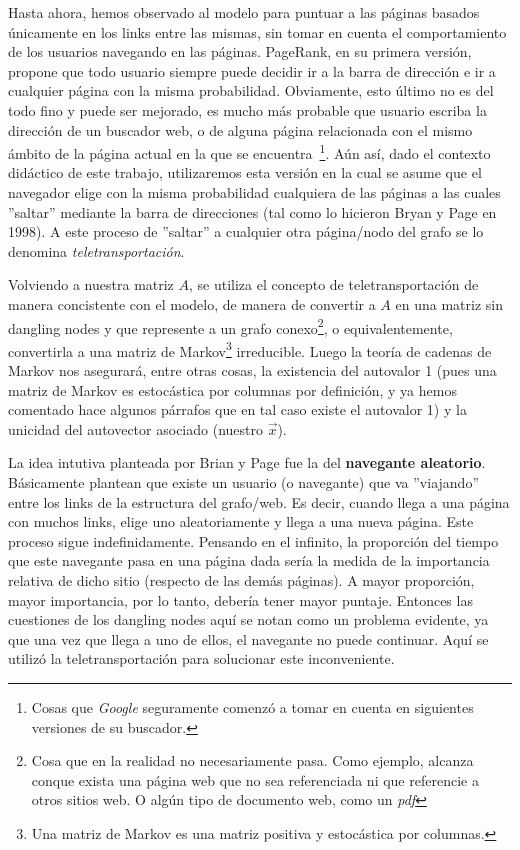 \par Hasta ahora, hemos observado al modelo para puntuar a las p\'aginas basados
\'unicamente en los links entre las mismas, sin tomar en cuenta el
comportamiento de los usuarios navegando en las p\'aginas. PageRank, en su
primera versi\'on, propone que todo usuario siempre puede decidir ir a la barra
de direcci\'on e ir a cualquier p\'agina con la misma probabilidad. Obviamente,
esto \'ultimo no es del todo fino y puede ser mejorado, es mucho m\'as probable
que usuario escriba la direcci\'on de un buscador web, o de alguna p\'agina
relacionada con el mismo \'ambito de la p\'agina actual en la que se
encuentra~\footnote{Cosas que \emph{Google} seguramente comenz\'o a tomar en
cuenta en siguientes versiones de su buscador.}. A\'un as\'i, dado el contexto
did\'actico de este trabajo, utilizaremos esta versi\'on en la cual se asume que
el navegador elige con la misma probabilidad cualquiera de las p\'aginas a las
cuales ''saltar'' mediante la barra de direcciones (tal como lo hicieron Bryan y
Page en 1998).  A este proceso de ''saltar'' a cualquier otra p\'agina/nodo del
grafo se lo denomina \emph{teletransportaci\'on}.

\par Volviendo a nuestra matriz $A$, se utiliza el concepto de
teletransportaci\'on de manera concistente con el modelo, de manera de convertir
a $A$ en una matriz sin dangling nodes y que represente a un grafo
conexo\footnote{Cosa que en la realidad no necesariamente pasa. Como ejemplo,
alcanza conque exista una p\'agina web que no sea referenciada ni que referencie
a otros sitios web. O alg\'un tipo de documento web, como un \emph{pdf}}, o
equivalentemente, convertirla a una matriz de Markov\footnote{Una matriz de
Markov es una matriz positiva y estoc\'astica por columnas.} irreducible. Luego
la teor\'ia de cadenas de Markov nos asegurar\'a, entre otras cosas, la
existencia del autovalor 1 (pues una matriz de Markov es estoc\'astica por
columnas por definici\'on, y ya hemos comentado hace algunos p\'arrafos que en
tal caso existe el autovalor 1) y la unicidad del autovector asociado (nuestro
$\overrightarrow{x}$).

\par La idea intutiva planteada por Brian y Page fue la del \textbf{navegante
aleatorio}. B\'asicamente plantean que existe un usuario (o navegante) que va
''viajando'' entre los links de la estructura del grafo/web. Es decir, cuando
llega a una p\'agina con muchos links, elige uno aleatoriamente y llega a una
nueva p\'agina. Este proceso sigue indefinidamente. Pensando en el infinito, la
proporci\'on del tiempo que este navegante pasa en una p\'agina dada ser\'ia la
medida de la importancia relativa de dicho sitio (respecto de las dem\'as
p\'aginas). A mayor proporci\'on, mayor importancia, por lo tanto, deber\'ia
tener mayor puntaje. Entonces las cuestiones de los dangling nodes aqu\'i se
notan como un problema evidente, ya que una vez que llega a uno de ellos, el
navegante no puede continuar. Aqu\'i se utiliz\'o la teletransportaci\'on para
solucionar este inconveniente.


